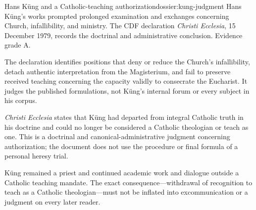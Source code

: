 \begin{heresydossier}{Hans K\"ung and a Catholic-teaching authorization}{dossier:kung-judgment}
\objectfield Hans K\"ung's works prompted prolonged examination and exchanges concerning Church, infallibility, and ministry. The CDF declaration \emph{Christi Ecclesia}, 15 December 1979, records the doctrinal and administrative conclusion. Evidence grade A.

\propositionfield The declaration identifies positions that deny or reduce the Church's infallibility, detach authentic interpretation from the Magisterium, and fail to preserve received teaching concerning the capacity validly to consecrate the Eucharist. It judges the published formulations, not K\"ung's internal forum or every subject in his corpus.

\responsefield \emph{Christi Ecclesia} states that K\"ung had departed from integral Catholic truth in his doctrine and could no longer be considered a Catholic theologian or teach as one. This is a doctrinal and canonical-administrative judgment concerning authorization; the document does not use the procedure or final formula of a personal heresy trial.

\aftermathfield K\"ung remained a priest and continued academic work and dialogue outside a Catholic teaching mandate. The exact consequence---withdrawal of recognition to teach as a Catholic theologian---must not be inflated into excommunication or a judgment on every later reader.
\end{heresydossier}

